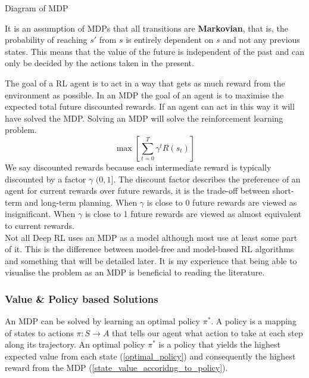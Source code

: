 \documentclass[10pt,journal,compsoc]{IEEEtran}
\begin{document}
Diagram of MDP

It is an assumption of MDPs that all transitions are \textbf{Markovian}, that is, the probability of reaching \begin{math}s'\end{math} from  \begin{math}s\end{math} is entirely dependent on  \begin{math}s\end{math} and not any previous states. This means that the value of the future is independent of the past and can only be decided by the actions taken in the present.

The goal of a RL agent is to act in a way that gets as much reward from the environment as possible. In an MDP the goal of an agent is to maximise the expected total future discounted rewards. If an agent can act in this way it will have solved the MDP. Solving an MDP will solve the reinforcement learning problem.
\begin{equation}
\label{mdp_goal}
\max[\sum\limits_{t=0}^{T} \gamma^tR(s_t)] %
\end{equation}
We say discounted rewards because each intermediate reward is typically discounted by a factor \begin{math}\gamma\end{math}  \begin{math}(0,1]\end{math}. The discount factor describes the preference of an agent for current rewards over future rewards, it is the trade-off between short-term and long-term planning. When  \begin{math}\gamma\end{math} is close to 0 future rewards are viewed as insignificant. When  \begin{math}\gamma\end{math} is close to 1 future rewards are viewed as almost equivalent to current rewards.
\\
Not all Deep RL uses an MDP as a model although most use at least some part of it. This is the difference between model-free and model-based RL algorithms and something that will be detailed later. It is my experience that being able to visualise the problem as an MDP is beneficial to reading the literature.
\subsubsection{Value \& Policy based Solutions}
An MDP can be solved by learning an optimal policy \begin{math}\pi^*\end{math}. A policy is a mapping of states to actions \begin{math}\pi : S \rightarrow A\end{math} that tells our agent what action to take at each step along its trajectory. An optimal policy \begin{math}\pi^*\end{math} is a policy that yields the highest expected value from each state (\ref{optimal_policy}) and consequently the highest reward from the MDP (\ref{state_value_accoridng_to_policy}).
\end{document}
